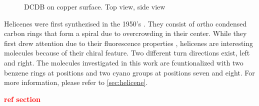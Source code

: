 	\begin{figure}[h!]
		\centering
		 \quad
		 \quad
		\caption{DCDB on copper surface.  Top view,  side view}
		\label{fig:helicene}
	\end{figure}
	
	Helicenes were first synthezised in the 1950's \cite{newman_synthesis_1956}. They consist of ortho condensed carbon rings that form a spiral due to overcrowding in their center. While they first drew attention due to their fluorescence properties \cite{vander_donckt_fluorescence_1968}, helicenes are interesting molecules because of their chiral feature. Two different turn directions exist, left and right. The molecules investigated in this work are fcuntionalized with two benzene rings at positions \underline{\qquad} and two cyano groups at positions seven and eight. For more information, please refer to \autoref{sec:helicene}.
	
	\textcolor{red}{\textbf{ref section}}